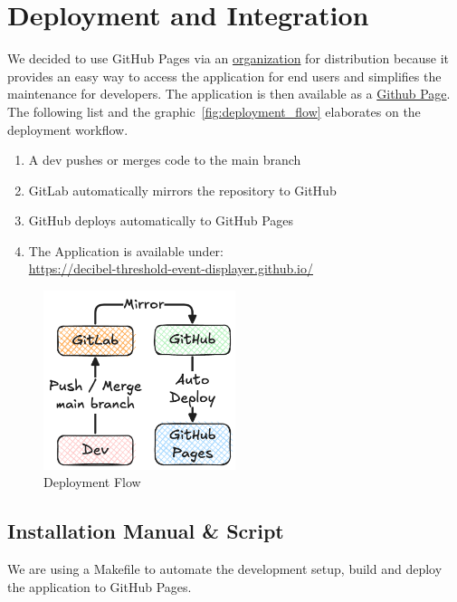\section{Deployment and Integration}\label{sec:deployment-and-integration}
We decided to use GitHub Pages via an \href{https://github.com/decibel-threshold-event-displayer}{organization} for distribution because it provides an easy way to access the
application for end users and simplifies the maintenance for developers. The application is then available as a \href{https://decibel-threshold-event-displayer.github.io/}{Github Page}.
The following list and the graphic~\autoref{fig:deployment_flow} elaborates on the deployment workflow.

\begin{enumerate}
    \item A dev pushes or merges code to the main branch
    \item GitLab automatically mirrors the repository to GitHub
    \item GitHub deploys automatically to GitHub Pages
    \item {The Application is available under: \\
          \href{https://decibel-threshold-event-displayer.github.io/}{https://decibel-threshold-event-displayer.github.io/}}
\end{enumerate}

\begin{figure}[H]
    \centering
    \includegraphics[width=0.5\textwidth]{../assets/deployment_and_distribution.png}
    \caption{Deployment Flow}\label{fig:deployment_flow}
\end{figure}

\subsection{Installation Manual \& Script}\label{subsec:installation-manuel-and-script}
We are using a Makefile to automate the development setup, build and deploy the application to GitHub Pages.

